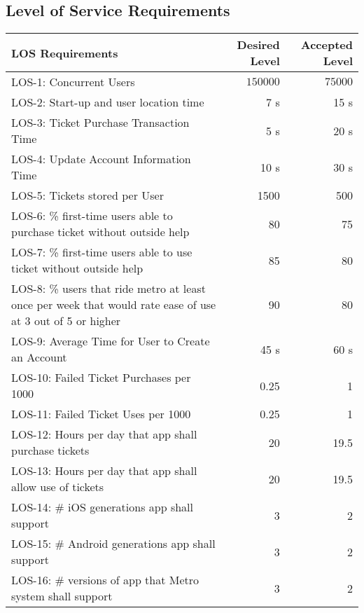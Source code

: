 \subsection{Level of Service Requirements}

\begin{table}[h]
    \begin{tabularx}{\textwidth}{Xrr}
    \hline
    LOS Requirements                                                                                          									& Desired Level & Accepted Level \\ \hline
    LOS-1: Concurrent Users														& $150000$		& $75000$           \\
    LOS-2: Start-up and user location time 										& 7 s  			& 15 s           \\
    LOS-3: Ticket Purchase Transaction Time										& 5 s 			& 20 s            \\
    LOS-4: Update Account Information Time										& 10 s 			& 30 s            \\
    LOS-5: Tickets stored per User												& 1500 			& 500            \\
    LOS-6: \% first-time users able to purchase ticket without outside help		& 80  			& 75             \\
    LOS-7: \% first-time users able to use ticket without outside help			& 85 			& 80             \\
    LOS-8: \% users that ride metro at least once per week that would rate 
    ease of use at 3 out of 5 or higher											& 90  			& 80             \\
    LOS-9: Average Time for User to Create an Account							& 45 s			& 60 s            \\
    LOS-10: Failed Ticket Purchases per 1000 									& 0.25  		& 1              \\
    LOS-11: Failed Ticket Uses per 1000  										& 0.25  		& 1              \\
    LOS-12: Hours per day that app shall purchase tickets 						& 20  			& 19.5             \\
    LOS-13: Hours per day that app shall allow use of tickets   				& 20 			& 19.5             \\
    LOS-14: \# iOS generations app shall support 								& 3  			& 2              \\
    LOS-15: \# Android generations app shall support   							& 3  			& 2              \\
    LOS-16: \# versions of app that Metro system shall support  				& 3    			& 2              \\
    \hline
    \end{tabularx}
\end{table}